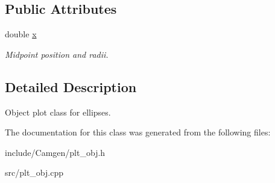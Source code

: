 \subsection*{Public Attributes}
\begin{DoxyCompactItemize}
\item 
\hypertarget{a00423_a280bea0c59d94c0187fb41013d8ab974}{double \hyperlink{a00423_a280bea0c59d94c0187fb41013d8ab974}{x}}\label{a00423_a280bea0c59d94c0187fb41013d8ab974}

\begin{DoxyCompactList}\small\item\em Midpoint position and radii. \end{DoxyCompactList}\end{DoxyCompactItemize}


\subsection{Detailed Description}
Object plot class for ellipses. 

The documentation for this class was generated from the following files\-:\begin{DoxyCompactItemize}
\item 
include/\-Camgen/plt\-\_\-obj.\-h\item 
src/plt\-\_\-obj.\-cpp\end{DoxyCompactItemize}

